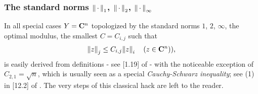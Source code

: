 \subsubsection{The standard norms $\norma{1}{\,\cdot\,}$, $\norma{2}{\,\cdot\,}$, $\norma{\infty}{\,\cdot\,}$}
In all special cases $Y=\C^n$ topologized by the standard norms $1$, $2$, $\infty$, 
the optimal modulus, \ie the smallest $C = C_{i, j}$ such that %
\begin{align}
	\norma{j}{z} \leq C_{i, j} \norma{i}{z} \quad \left(z \in \C^n \right)),
\end{align}
is easily derived from definitions - see [1.19] of \cite{FA} - %
with the noticeable exception of $C_{2, 1}=\sqrt{n}$, which is usually seen as a special {\it Cauchy-Schwarz inequality}; %
see (1) in [12.2] of \cite{FA}. %
The very steps of this classical hack are left to the reader. %
